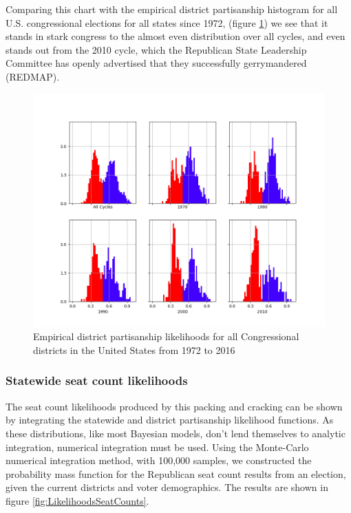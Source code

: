 \documentclass[preprint,12pt]{article}
\begin{document}
Comparing this chart with the empirical district partisanship histogram for all U.S. congressional elections for all states since 1972, (figure \ref{fig:LikelihoodsDistrictPartisanshipAll}) we see that it stands in stark congress to the almost even distribution over all cycles, and even stands out from the 2010 cycle, which the Republican State Leadership Committee has openly advertised that they successfully gerrymandered (REDMAP).

\begin{figure}[htb!]
    \begin{center}
        \includegraphics[scale=0.5]{../Figures/WI2010/cycle_partisan_likelihoods.png}
        \caption{Empirical district partisanship likelihoods for all Congressional districts in the United States from 1972 to 2016}\label{fig:LikelihoodsDistrictPartisanshipAll}
    \end{center}
\end{figure}
 
\subsubsection{Statewide seat count likelihoods}
 
The seat count likelihoods produced by this packing and cracking can be shown by integrating the statewide and district partisanship likelihood functions.  As these distributions, like most Bayesian models, don't lend themselves to analytic integration, numerical integration must be used. Using the Monte-Carlo numerical integration method, with 100,000 samples, we constructed the probability mass function for the Republican seat count results from an election, given the current districts and voter demographics.  The results are shown in figure \ref{fig:LikelihoodsSeatCounts}.
 
\end{document}
